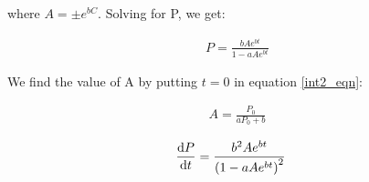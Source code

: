 \documentclass[12pt]{article}
\begin{document}
where $A = \pm e^{bC}$. Solving for P, we get:

\begin{align*}
P = \frac{bAe^{bt}}{1 - aAe^{bt}}
\end{align*}

We find the value of A by putting $t = 0$ in equation \ref{int2_eqn}:

\begin{align*}
A = \frac{P_0}{aP_0 + b}
\end{align*}

\begin{align*}
\diff{P}{t} &= \dfrac{b^2Ae^{bt}}{\left ( 1 - aAe^{bt} \right ) ^2}
\end{align*}

\printbibliography
\end{document}
